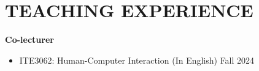 \documentclass[a4paper,11pt]{article}
\makeatletter
\newcommand{\resumePOR}[3]{
\vspace{0.5mm}\item
    \begin{tabular*}{0.97\textwidth}[t]{l@{\extracolsep{\fill}}r}
        \textbf{#1}\hspace{0.3mm}#2 & \textit{\small{#3}} 
    \end{tabular*}
    \vspace{-2mm}
}
\newcommand{\resumeProject}[4]{
\vspace{0.5mm}\item
    \begin{tabular*}{0.98\textwidth}[t]{l@{\extracolsep{\fill}}r}
        \textbf{#1} & \textit{\footnotesize{#3}} \\
        \footnotesize{\textit{#2}} & \footnotesize{#4}
    \end{tabular*}
    \vspace{-2.4mm}
}
\newcommand{\resumeSubHeadingListStart}{\begin{itemize}[leftmargin=*,labelsep=1mm]}
\newcommand{\resumeItemListStart}{\begin{itemize}[leftmargin=*,labelsep=1mm,itemsep=0.5mm]}
\newcommand{\resumeSubHeadingListEnd}{\end{itemize}\vspace{2mm}}
\newcommand{\resumeItemListEnd}{\end{itemize}\vspace{-2mm}}
\makeatother
\begin{document}





\section{\textbf{TEACHING EXPERIENCE}}
\textbf{Co-lecturer}
\vspace{-0.7mm}
\resumeItemListStart
  \item ITE3062: Human-Computer Interaction (In English) \hfill Fall 2024 \\
\resumeItemListEnd
\vspace{1.0mm}
\end{document}
